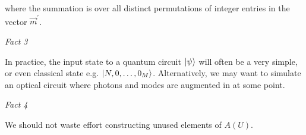 \documentclass[aps,pra,twocolumn,showpacs,superscriptaddress,floatfix,10pt]{revtex4}
\begin{document}
where the summation is over all distinct permutations of integer entries in the vector $\vec{m}^\prime$.
\begin{center}\textit{Fact 3} \end{center}
\newline
\newline
\newline
In practice, the input state to a quantum circuit $\ket{\psi}$ will often be a very simple, or even classical state e.g. $\ket{N,0,\dots,0_M}$. Alternatively, we may want to simulate an optical circuit where photons and modes are augmented in at some point. 
\begin{center}\textit{Fact 4} \end{center}
\newline
\newline
\newline
We should not waste effort constructing unused elements of $A(U)$.
\end{document}
